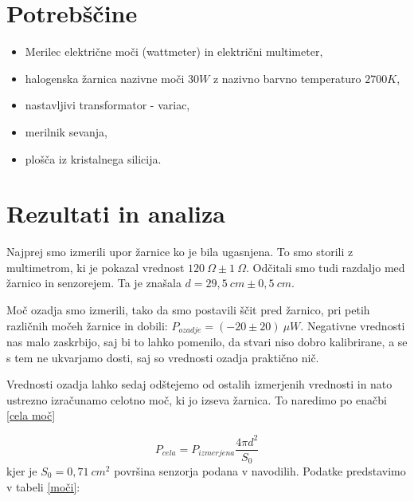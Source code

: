 \documentclass[10pt]{article}
\begin{document}
\section{Potrebščine}

\begin{itemize}
    \item Merilec električne moči (wattmeter) in električni multimeter,
    \item halogenska žarnica nazivne moči $30W$ z nazivno barvno temperaturo $2700K$,
    \item nastavljivi transformator - variac,
    \item merilnik sevanja,
    \item plošča iz kristalnega silicija.
\end{itemize}

\section{Rezultati in analiza}

Najprej smo izmerili upor žarnice ko je bila ugasnjena. To smo storili z multimetrom, ki je pokazal vrednost $120\ \Omega \pm 1\ \Omega$. Odčitali smo tudi razdaljo med žarnico in senzorejem. Ta je znašala $d = 29,5\ cm \pm 0,5\ cm$.

Moč ozadja smo izmerili, tako da smo postavili ščit pred žarnico, pri petih različnih močeh žarnice in dobili: $P_{ozadje} = (-20\pm 20)\ \mu W$. Negativne vrednosti nas malo zaskrbijo, saj bi to lahko pomenilo, da stvari niso dobro kalibrirane, a se s tem ne ukvarjamo dosti, saj so vrednosti ozadja praktično nič.

\bigskip

\noindent Vrednosti ozadja lahko sedaj odštejemo od ostalih izmerjenih vrednosti in nato ustrezno izračunamo celotno moč, ki jo izseva žarnica. To naredimo po enačbi \ref{cela moč}

\begin{equation}
    P_{cela} = P_{izmerjena} \frac{4\pi d^2}{S_0}
    \label{cela moč}
\end{equation}
kjer je $S_0 = 0,71\ cm^2$ površina senzorja podana v navodilih. Podatke predstavimo v tabeli \ref{moči}:
\end{document}
